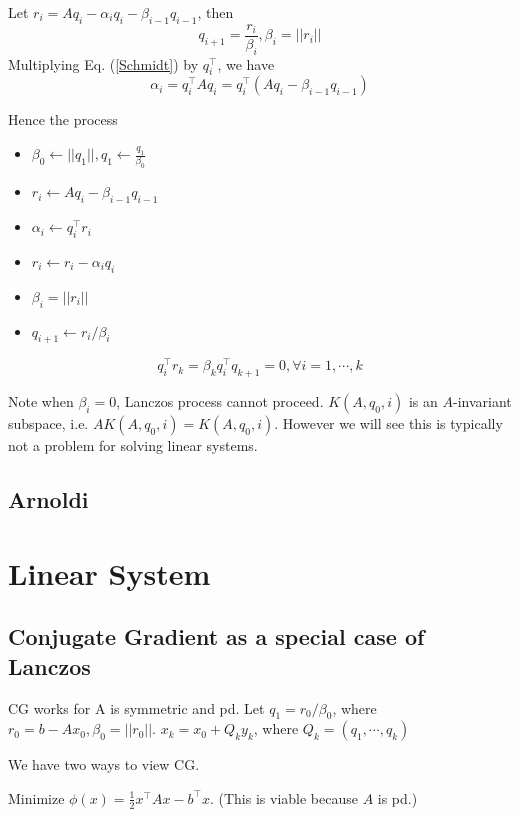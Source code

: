 \documentclass{article}
\newenvironment{remark}[1][Remark]{\begin{trivlist}
\item[\hskip \labelsep {\bfseries #1}]}{\end{trivlist}}
\begin{document}
Let $r_i = Aq_i - \alpha_i q_i - \beta_{i-1}q_{i-1}$, then
$$q_{i+1} = \frac{r_i}{\beta_i}, \beta_i = ||r_i||$$
Multiplying Eq. (\ref{Schmidt}) by $q_i^\top$, we have
$$\alpha_i = q_i^\top A q_i = q_i^\top (Aq_i - \beta_{i-1}q_{i-1})$$

Hence the process
\begin{itemize}
\item $\beta_0 \leftarrow ||q_1||, q_1 \leftarrow \frac{q_1}{\beta_0}$
\item $r_i \leftarrow Aq_i - \beta_{i-1}q_{i-1}$
\item $\alpha_i \leftarrow q_i^\top r_i$
\item $r_i \leftarrow r_i - \alpha_i q_i$
\item $\beta_i = ||r_i||$
\item $q_{i+1} \leftarrow r_i / \beta_i$
\end{itemize}

\begin{remark}
$$q_i^\top r_k = \beta_k q_i^\top q_{k+1} = 0, \forall i=1, \cdots, k$$
\end{remark}

\begin{remark}
Note when $\beta_i = 0$, Lanczos process cannot proceed. $K(A, q_0, i)$ is an $A$-invariant subspace, i.e. $A K(A, q_0, i) = K(A, q_0, i)$.
However we will see this is typically not a problem for solving linear systems.
\end{remark}

\subsection{Arnoldi}

\section{Linear System}
\subsection{Conjugate Gradient as a special case of Lanczos}
CG works for A is symmetric and pd. Let $q_1 = r_0 / \beta_0$, where $r_0 = b - Ax_0, \beta_0 = ||r_0||$. $x_k = x_0 + Q_k y_k$, where $Q_k = (q_1, \cdots, q_k)$

We have two ways to view CG.

\begin{center}
Minimize $\phi(x) = \frac{1}{2} x^\top A x - b^\top x$. (This is viable because $A$ is pd.)
\end{center}
\end{document}
